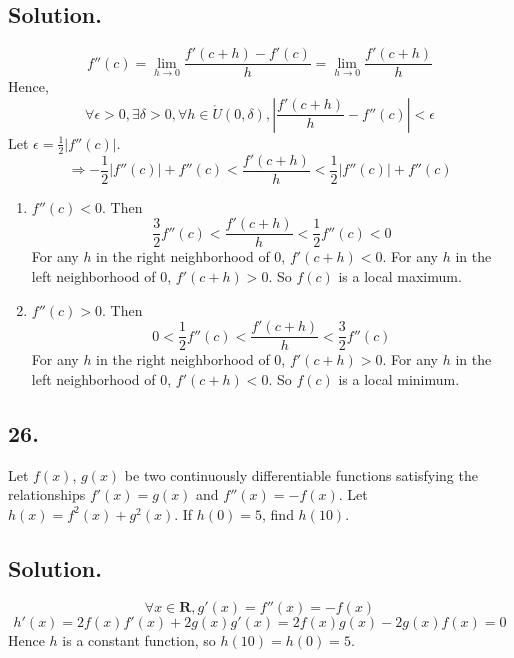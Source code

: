 \documentclass{article}
\begin{document}
\subsection*{Solution.}
\[f''(c)=\lim_{h\to 0} \frac{f'(c+h)-f'(c)}{h}=\lim_{h\to 0} \frac{f'(c+h)}{h}\]
Hence, \[\forall \epsilon>0,\exists\delta>0,\forall h\in \mathring{U}(0,\delta),|\frac{f'(c+h)}{h}-f''(c)|<\epsilon\]
Let $\epsilon=\frac{1}{2}|f''(c)|$.
\[\Rightarrow -\frac{1}{2}|f''(c)|+f''(c)<\frac{f'(c+h)}{h}<\frac{1}{2}|f''(c)|+f''(c)\]
\begin{enumerate} [label=\textbf{\alph*.}]
    \item $f''(c)<0$. Then
    \[\frac{3}{2}f''(c)<\frac{f'(c+h)}{h}<\frac{1}{2}f''(c)<0\]
    For any $h$ in the right neighborhood of 0, $f'(c+h)<0$.\newline
    For any $h$ in the left neighborhood of 0, $f'(c+h)>0$. So $f(c)$ is a local maximum.
    \item $f''(c)>0$. Then
    \[0<\frac{1}{2}f''(c)<\frac{f'(c+h)}{h}<\frac{3}{2}f''(c)\]
    For any $h$ in the right neighborhood of 0, $f'(c+h)>0$.\newline
    For any $h$ in the left neighborhood of 0, $f'(c+h)<0$. So $f(c)$ is a local minimum.
\end{enumerate}
\subsection*{26.}
Let $f(x)$, $g(x)$ be two continuously differentiable  functions satisfying the relationships $f'(x)=g(x)$ and $f''(x)=-f(x)$. Let $h(x)=f^2(x)+g^2(x)$. If $h(0)=5$, find $h(10)$.
\subsection*{Solution.}
\[\forall x\in\mathbf{R}, g'(x)=f''(x)=-f(x)\]
\[h'(x)=2f(x)f'(x)+2g(x)g'(x)=2f(x)g(x)-2g(x)f(x)=0\]
Hence $h$ is a constant function, so $h(10)=h(0)=5$.
\end{document}
